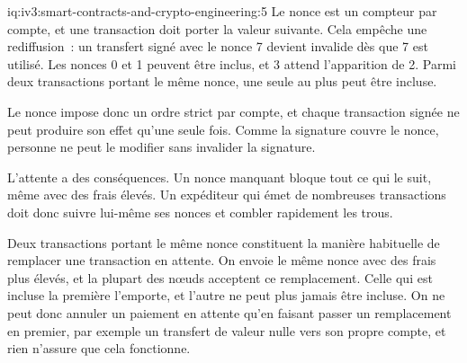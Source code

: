 \begin{solution}{iq:iv3:smart-contracts-and-crypto-engineering:5}
Le nonce est un compteur par compte, et une transaction doit porter la valeur suivante. Cela empêche une rediffusion~: un transfert signé avec le nonce 7 devient invalide dès que 7 est utilisé. Les nonces 0 et 1 peuvent être inclus, et 3 attend l'apparition de 2. Parmi deux transactions portant le même nonce, une seule au plus peut être incluse.

Le nonce impose donc un ordre strict par compte, et chaque transaction signée ne peut produire son effet qu'une seule fois. Comme la signature couvre le nonce, personne ne peut le modifier sans invalider la signature.

L'attente a des conséquences. Un nonce manquant bloque tout ce qui le suit, même avec des frais élevés. Un expéditeur qui émet de nombreuses transactions doit donc suivre lui-même ses nonces et combler rapidement les trous.

Deux transactions portant le même nonce constituent la manière habituelle de remplacer une transaction en attente. On envoie le même nonce avec des frais plus élevés, et la plupart des nœuds acceptent ce remplacement. Celle qui est incluse la première l'emporte, et l'autre ne peut plus jamais être incluse. On ne peut donc annuler un paiement en attente qu'en faisant passer un remplacement en premier, par exemple un transfert de valeur nulle vers son propre compte, et rien n'assure que cela fonctionne.

\end{solution}

